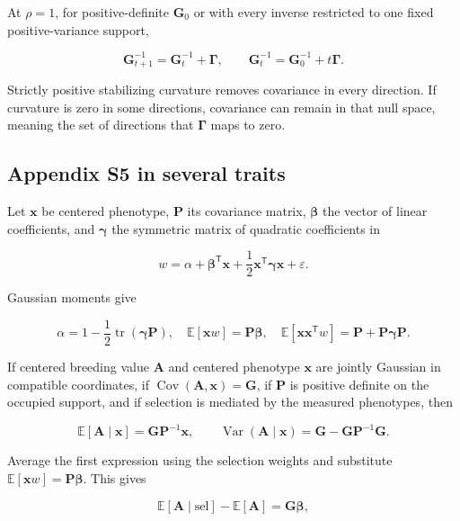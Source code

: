 \documentclass[11pt]{article}
\newcommand{\vect}[1]{\boldsymbol{#1}}
\newcommand{\mat}[1]{\mathbf{#1}}
\newcommand{\bGamma}{\boldsymbol{\Gamma}}
\newcommand{\bgamma}{\boldsymbol{\gamma}}
\newcommand{\E}{\mathbb{E}}
\newcommand{\Var}{\operatorname{Var}}
\newcommand{\Cov}{\operatorname{Cov}}
\newcommand{\tr}{\operatorname{tr}}
\begin{document}
At $\rho=1$, for positive-definite $\mat G_0$ or with every inverse restricted
to one fixed positive-variance support,

\begin{equation}
\mat G_{t+1}^{-1}=\mat G_t^{-1}+\bGamma,
\qquad
\mat G_t^{-1}=\mat G_0^{-1}+t\bGamma.
\end{equation}

Strictly positive stabilizing curvature removes covariance in every
direction.  If curvature is zero in some directions, covariance can remain in
that null space, meaning the set of directions that $\bGamma$ maps to zero.

\subsection{Appendix S5 in several traits}
\label{sec:multi-s5}

Let $\vect x$ be centered phenotype, $\mat P$ its covariance matrix,
$\vect\beta$ the vector of linear coefficients, and $\bgamma$ the symmetric
matrix of quadratic coefficients in

\begin{equation}
w=\alpha+\vect\beta^{\mathsf T}\vect x
+\frac12\vect x^{\mathsf T}\bgamma\vect x+\varepsilon.
\end{equation}

Gaussian moments give

\begin{equation}
\alpha=1-\frac12\tr(\bgamma\mat P),\quad
\E[\vect xw]=\mat P\vect\beta,\quad
\E[\vect x\vect x^{\mathsf T}w]
=\mat P+\mat P\bgamma\mat P.
\end{equation}

If centered breeding value $\vect A$ and centered phenotype $\vect x$ are
jointly Gaussian in compatible coordinates, if
$\Cov(\vect A,\vect x)=\mat G$, if $\mat P$ is positive definite on the
occupied support, and if selection is mediated by the measured phenotypes,
then

\begin{equation}
\E[\vect A\mid\vect x]=\mat G\mat P^{-1}\vect x,
\qquad
\Var(\vect A\mid\vect x)
=\mat G-\mat G\mat P^{-1}\mat G.
\label{eq:guide-multi-conditioning}
\end{equation}

Average the first expression using the selection weights and substitute
$\E[\vect xw]=\mat P\vect\beta$.  This gives

\begin{equation}
\E[\vect A\mid\mathrm{sel}]-\E[\vect A]=\mat G\vect\beta,
\end{equation}
\end{document}
